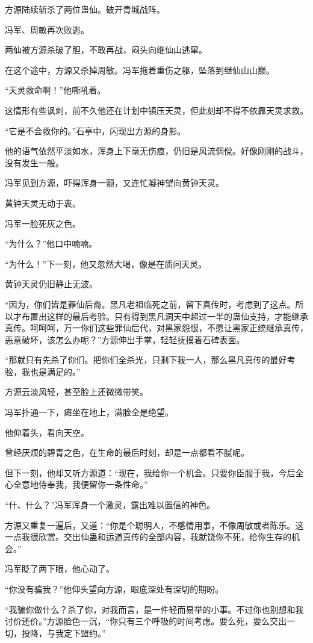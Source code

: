 \begin{this_body}
方源陆续斩杀了两位蛊仙。破开青城战阵。

冯军、周敏再次败逃。

两仙被方源杀破了胆，不敢再战，闷头向继仙山逃窜。

在这个途中，方源又杀掉周敏。冯军拖着重伤之躯，坠落到继仙山山巅。

“天灵救命啊！”他嘶吼着。

这情形有些讽刺，前不久他还在计划中镇压天灵，但此刻却不得不依靠天灵求救。

“它是不会救你的。”石亭中，闪现出方源的身影。

他的语气依然平淡如水，浑身上下毫无伤痕，仍旧是风流倜傥。好像刚刚的战斗，没有发生一般。

冯军见到方源，吓得浑身一颤，又连忙凝神望向黄钟天灵。

黄钟天灵无动于衷。

冯军一脸死灰之色。

“为什么？”他口中喃喃。

“为什么！”下一刻，他又忽然大喝，像是在质问天灵。

黄钟天灵仍旧静止无波。

“因为，你们皆是罪仙后裔。黑凡老祖临死之前，留下真传时，考虑到了这点。所以才布置出这样的最后考验。只有得到黑凡洞天中超过一半的蛊仙支持，才能继承真传。呵呵呵，万一你们这些罪仙后代，对黑家怨恨，不愿让黑家正统继承真传，恶意破坏，该怎么办呢？”方源伸出手掌，轻轻抚摸着石碑表面。

“那就只有先杀了你们。把你们全杀光，只剩下我一人，那么黑凡真传的最好考验，我也是满足的。”

方源云淡风轻，甚至脸上还微微带笑。

冯军扑通一下，瘫坐在地上，满脸全是绝望。

他仰着头，看向天空。

曾经厌烦的碧青之色，在生命的最后时刻，却是一点都看不腻呢。

但下一刻，他却又听方源道：“现在，我给你一个机会。只要你臣服于我，今后全心全意地侍奉我，我便留你一条性命。”

“什、什么？”冯军浑身一个激灵，露出难以置信的神色。

方源又重复一遍后，又道：“你是个聪明人，不感情用事，不像周敏或者陈乐。这一点我很欣赏。交出仙蛊和运道真传的全部内容，我就饶你不死，给你生存的机会。”

冯军眨了两下眼，他心动了。

“你没有骗我？”他仰头望向方源，眼底深处有深切的期盼。

“我骗你做什么？杀了你，对我而言，是一件轻而易举的小事。不过你也别想和我讨价还价。”方源脸色一沉，“你只有三个呼吸的时间考虑。要么死，要么交出一切，投降，与我定下盟约。”


\end{this_body}
